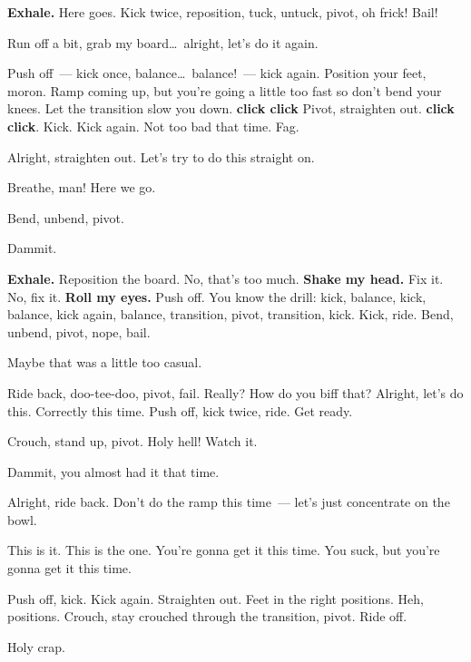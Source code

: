 \textbf{Exhale.} Here goes. Kick twice, reposition, tuck, untuck, pivot, oh frick! Bail!

Run off a bit, grab my board\dots\ alright, let's do it again.

Push off~--- kick once, balance\dots\ balance!~--- kick again. Position your feet, moron. Ramp coming up, but you're going a little too fast so don't bend your knees. Let the transition slow you down. \textbf{click click} Pivot, straighten out. \textbf{click click}. Kick. Kick again. Not too bad that time. Fag.

Alright, straighten out. Let's try to do this straight on.

Breathe, man! Here we go.

Bend, unbend, pivot.

Dammit.

\textbf{Exhale.} Reposition the board. No, that's too much. \textbf{Shake my head.} Fix it. No, fix it. \textbf{Roll my eyes.} Push off. You know the drill: kick, balance, kick, balance, kick again, balance, transition, pivot, transition, kick. Kick, ride. Bend, unbend, pivot, nope, bail.

Maybe that was a little too casual.

Ride back, doo-tee-doo, pivot, fail. Really? How do you biff that? Alright, let's do this. Correctly this time. Push off, kick twice, ride. Get ready.

Crouch, stand up, pivot. Holy hell! Watch it.

Dammit, you almost had it that time.

Alright, ride back. Don't do the ramp this time~--- let's just concentrate on the bowl.

This is it. This is the one. You're gonna get it this time. You suck, but you're gonna get it this time.

Push off, kick. Kick again. Straighten out. Feet in the right positions. Heh, positions. Crouch, stay crouched through the transition, pivot. Ride off.

\begin{center}Holy crap.\end{center}
